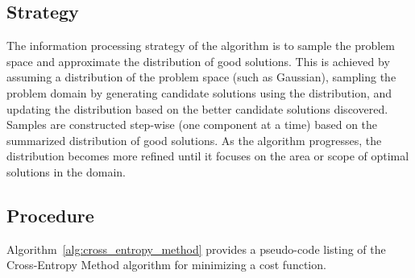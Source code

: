 \subsection{Strategy}
The information processing strategy of the algorithm is to sample the problem space and approximate the distribution of good solutions.
This is achieved by assuming a distribution of the problem space (such as Gaussian), sampling the problem domain by generating candidate solutions using the distribution, and updating the distribution based on the better candidate solutions discovered. Samples are constructed step-wise (one component at a time) based on the summarized distribution of good solutions. As the algorithm progresses, the distribution becomes more refined until it focuses on the area or scope of optimal solutions in the domain.

\subsection{Procedure}
Algorithm~\ref{alg:cross_entropy_method} provides a pseudo-code listing of the Cross-Entropy Method algorithm for minimizing a cost function.

